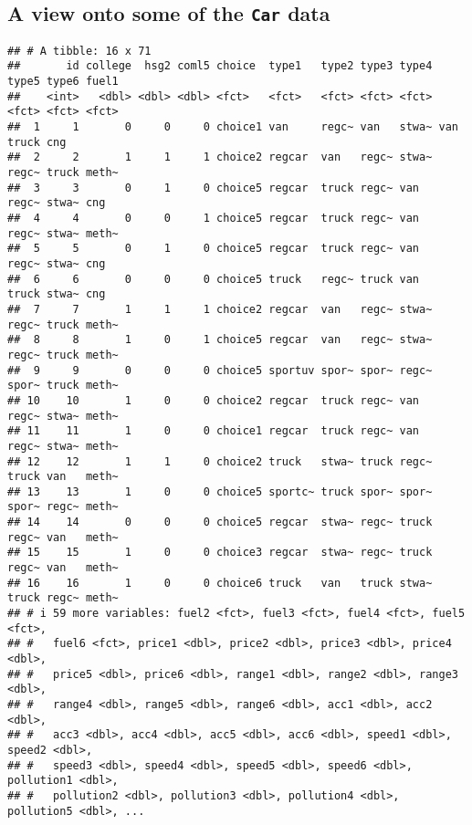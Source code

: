 \documentclass[
  11pt,
]{article}
\begin{document}
\normalsize

\hypertarget{a-view-onto-some-of-the-car-data}{%
\subsection{\texorpdfstring{A view onto some of the \texttt{Car}
data}{A view onto some of the Car data}}\label{a-view-onto-some-of-the-car-data}}

\scriptsize

\begin{verbatim}
## # A tibble: 16 x 71
##       id college  hsg2 coml5 choice  type1   type2 type3 type4 type5 type6 fuel1
##    <int>   <dbl> <dbl> <dbl> <fct>   <fct>   <fct> <fct> <fct> <fct> <fct> <fct>
##  1     1       0     0     0 choice1 van     regc~ van   stwa~ van   truck cng  
##  2     2       1     1     1 choice2 regcar  van   regc~ stwa~ regc~ truck meth~
##  3     3       0     1     0 choice5 regcar  truck regc~ van   regc~ stwa~ cng  
##  4     4       0     0     1 choice5 regcar  truck regc~ van   regc~ stwa~ meth~
##  5     5       0     1     0 choice5 regcar  truck regc~ van   regc~ stwa~ cng  
##  6     6       0     0     0 choice5 truck   regc~ truck van   truck stwa~ cng  
##  7     7       1     1     1 choice2 regcar  van   regc~ stwa~ regc~ truck meth~
##  8     8       1     0     1 choice5 regcar  van   regc~ stwa~ regc~ truck meth~
##  9     9       0     0     0 choice5 sportuv spor~ spor~ regc~ spor~ truck meth~
## 10    10       1     0     0 choice2 regcar  truck regc~ van   regc~ stwa~ meth~
## 11    11       1     0     0 choice1 regcar  truck regc~ van   regc~ stwa~ meth~
## 12    12       1     1     0 choice2 truck   stwa~ truck regc~ truck van   meth~
## 13    13       1     0     0 choice5 sportc~ truck spor~ spor~ spor~ regc~ meth~
## 14    14       0     0     0 choice5 regcar  stwa~ regc~ truck regc~ van   meth~
## 15    15       1     0     0 choice3 regcar  stwa~ regc~ truck regc~ van   meth~
## 16    16       1     0     0 choice6 truck   van   truck stwa~ truck regc~ meth~
## # i 59 more variables: fuel2 <fct>, fuel3 <fct>, fuel4 <fct>, fuel5 <fct>,
## #   fuel6 <fct>, price1 <dbl>, price2 <dbl>, price3 <dbl>, price4 <dbl>,
## #   price5 <dbl>, price6 <dbl>, range1 <dbl>, range2 <dbl>, range3 <dbl>,
## #   range4 <dbl>, range5 <dbl>, range6 <dbl>, acc1 <dbl>, acc2 <dbl>,
## #   acc3 <dbl>, acc4 <dbl>, acc5 <dbl>, acc6 <dbl>, speed1 <dbl>, speed2 <dbl>,
## #   speed3 <dbl>, speed4 <dbl>, speed5 <dbl>, speed6 <dbl>, pollution1 <dbl>,
## #   pollution2 <dbl>, pollution3 <dbl>, pollution4 <dbl>, pollution5 <dbl>, ...
\end{verbatim}
\end{document}
